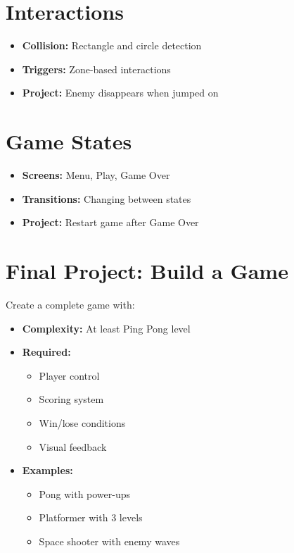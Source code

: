 \documentclass{article}
\begin{document}
\section{Interactions}
\begin{itemize}[nosep, leftmargin=*]
\item \textbf{Collision:} Rectangle and circle detection
\item \textbf{Triggers:} Zone-based interactions
\item \textbf{Project:} Enemy disappears when jumped on
\end{itemize}

\section{Game States}
\begin{itemize}[nosep, leftmargin=*]
\item \textbf{Screens:} Menu, Play, Game Over
\item \textbf{Transitions:} Changing between states
\item \textbf{Project:} Restart game after Game Over
\end{itemize}

\section{Final Project: Build a Game}
Create a complete game with:
\begin{itemize}[nosep, leftmargin=*]
\item \textbf{Complexity:} At least Ping Pong level
\item \textbf{Required:} 
    \begin{itemize}
    \item Player control
    \item Scoring system
    \item Win/lose conditions
    \item Visual feedback
    \end{itemize}
\item \textbf{Examples:} 
    \begin{itemize}
    \item Pong with power-ups
    \item Platformer with 3 levels
    \item Space shooter with enemy waves
    \end{itemize}
\end{itemize}
\end{document}
